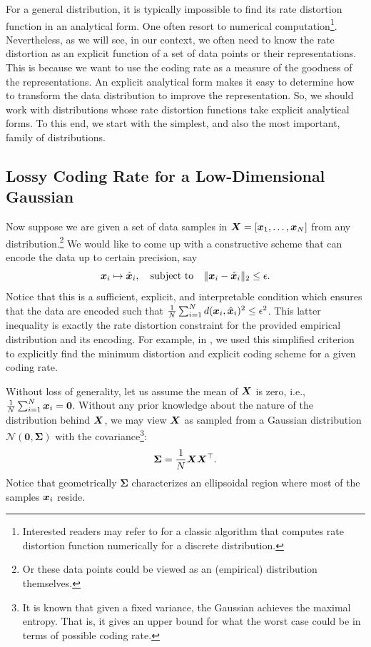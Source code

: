 \documentclass[../../book-main.tex]{subfiles}
\begin{document}
For a general distribution, it is typically impossible to find its rate distortion function in an analytical form. One often resort to numerical computation\footnote{Interested readers may refer to \cite{Blahut-1972} for a classic algorithm that computes rate distortion function numerically for a discrete distribution.}.  Nevertheless, as we will see, in our context, we often need to know the rate distortion as an explicit function of a set of data points or their representations. This is because we want to use the coding rate as a measure of the goodness of the representations. An explicit analytical form makes it easy to determine how to transform the data distribution to improve the representation. So, we should work with distributions whose rate distortion functions take explicit analytical forms. To this end, we start with the simplest, and also the most important, family of distributions.

\subsection{Lossy Coding Rate for a Low-Dimensional Gaussian}\label{subsec:lossy DR}
Now suppose we are given a set of data samples in $\bm{X} = [\bm{x}_1, \ldots, \bm{x}_N]$ from any distribution.\footnote{Or these data points could be viewed as an (empirical) distribution themselves.} We would like to come up with a constructive scheme that can encode the data up to certain precision, say
\begin{equation}
	\bm{x}_i \mapsto \hat {\bm{x}}_i, \quad \mbox{subject to} \quad \|\bm{x}_i - \hat {\bm{x}}_i\|_2 \le \epsilon.
\end{equation}
Notice that this is a sufficient, explicit, and interpretable condition which ensures that the data are encoded such that \(\frac{1}{N}\sum_{i = 1}^{N} d(\bm{x}_i, \hat {\bm{x}}_i)^{2} \le \epsilon^{2}\). This latter inequality is exactly the rate distortion constraint for the provided empirical distribution and its encoding. For example, in , we used this simplified criterion to explicitly find the minimum distortion and explicit coding scheme for a given coding rate.

Without loss of generality, let us assume the mean of $\bm{X}$ is zero, i.e., $\frac{1}{N} \sum_{i = 1}^{N} \bm{x}_i = \boldsymbol{0}$. Without any prior knowledge about the nature of the distribution behind $\bm{X}$, we may view $\bm{X}$ as sampled from a Gaussian distribution $\mathcal{N}(\boldsymbol{0}, {\boldsymbol{\Sigma}})$ with the covariance\footnote{It is known that given a fixed variance, the Gaussian achieves the maximal entropy. That is, it gives an upper bound for what the worst case could be in terms of possible coding rate.}:
\begin{equation}
	{\boldsymbol{\Sigma}} = \frac{1}{N} \bm{X}\bm{X}^\top.
\end{equation}
Notice that geometrically ${\boldsymbol{\Sigma}}$ characterizes an ellipsoidal region where most of the samples $\bm{x}_i$ reside.
\end{document}
